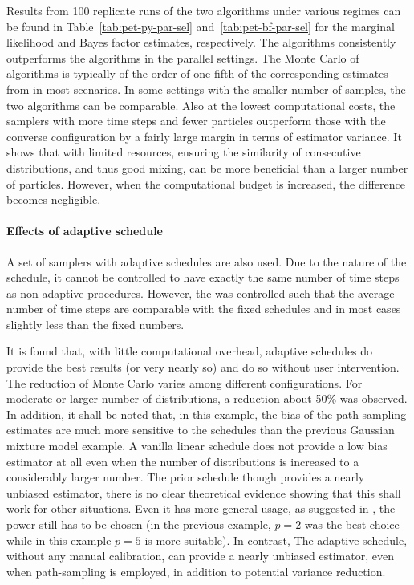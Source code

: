 Results from 100 replicate runs of the two algorithms under various regimes
can be found in Table~\ref{tab:pet-py-par-sel} and~\ref{tab:pet-bf-par-sel}
for the marginal likelihood and Bayes factor estimates, respectively. The \smc
algorithms consistently outperforms the \pmcmc algorithms in the parallel
settings. The Monte Carlo \sd of \smc algorithms is typically of the order of
one fifth of the corresponding estimates from \pmcmc in most scenarios. In
some settings with the smaller number of samples, the two algorithms can be
comparable. Also at the lowest computational costs, the samplers with more
time steps and fewer particles outperform those with the converse
configuration by a fairly large margin in terms of estimator variance. It
shows that with limited resources, ensuring the similarity of consecutive
distributions, and thus good mixing, can be more beneficial than a larger
number of particles. However, when the computational budget is increased, the
difference becomes negligible.

\begin{landscape}


\end{landscape}

\paragraph{Effects of adaptive schedule}

A set of samplers with adaptive schedules are also used. Due to the nature of
the schedule, it cannot be controlled to have exactly the same number of time
steps as non-adaptive procedures. However, the \cess was controlled such that
the average number of time steps are comparable with the fixed schedules and
in most cases slightly less than the fixed numbers.

It is found that, with little computational overhead, adaptive schedules do
provide the best results (or very nearly so) and do so without user
intervention. The reduction of Monte Carlo \sd varies among different
configurations. For moderate or larger number of distributions, a reduction
about 50\% was observed. In addition, it shall be noted that, in this example,
the bias of the path sampling estimates are much more sensitive to the
schedules than the previous Gaussian mixture model example. A vanilla linear
schedule does not provide a low bias estimator at all even when the number of
distributions is increased to a considerably larger number. The prior schedule
though provides a nearly unbiased estimator, there is no clear theoretical
evidence showing that this shall work for other situations. Even it has more
general usage, as suggested in \cite{Calderhead:2009bd}, the power still has
to be chosen (in the previous \gmm example, $p = 2$ was the best choice while
in this \pet example $p = 5$ is more suitable). In contrast, The adaptive
schedule, without any manual calibration, can provide a nearly unbiased
estimator, even when path-sampling is employed, in addition to potential
variance reduction.

